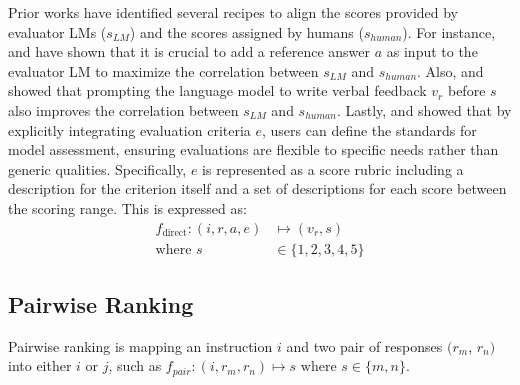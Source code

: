 \documentclass[11pt]{article}
\begin{document}
Prior works have identified several recipes to align the scores provided by evaluator LMs (${s}_{LM}$) and the scores assigned by humans (${s}_{human}$). For instance, \citet{liu2023geval} and \citet{zheng2023judging} have shown that it is crucial to add a reference answer $a$ as input to the evaluator LM to maximize the correlation between ${s}_{LM}$ and ${s}_{human}$. Also, \citet{zheng2023judging} and \citet{ye2023flask} showed that prompting the language model to write verbal feedback ${v}_{r}$ before $s$ also improves the correlation between ${s}_{LM}$ and ${s}_{human}$. Lastly, \citet{ye2023flask} and \citet{kim2023prometheus} showed that by explicitly integrating evaluation criteria $e$, users can define the standards for model assessment, ensuring evaluations are flexible to specific needs rather than generic qualities. Specifically, $e$ is represented as a score rubric including a description for the criterion itself and a set of descriptions for each score between the scoring range. This is expressed as: 
\begin{equation}
\begin{aligned}
f_{\text{direct}}: (i, r, a, e) &\mapsto ({v}_{r}, s) \\
\text{where } s &\in \{1, 2, 3, 4, 5\}
\end{aligned}
\end{equation}



\subsection{Pairwise Ranking}\label{reward_modeling}

Pairwise ranking is mapping an instruction $i$ and two pair of responses $({r}_{m}$, ${r}_{n})$ into either $i$ or $j$, such as ${f}_{pair}: (i, r_m, r_n) \mapsto s \text{ where } s \in \{m, n\}$.

\end{document}
